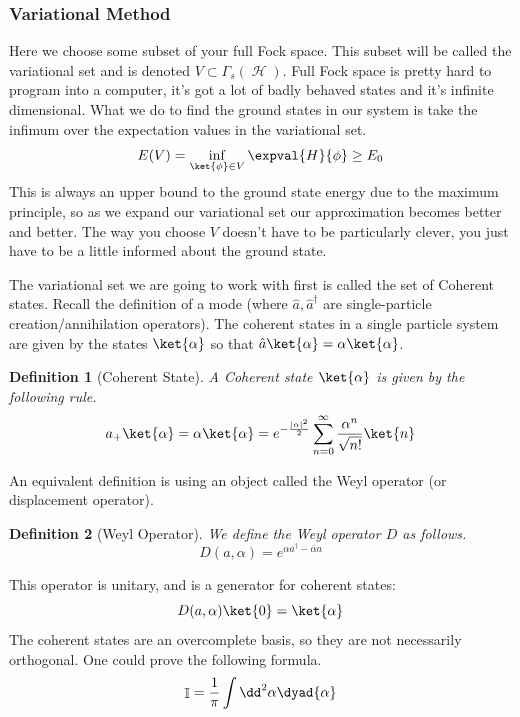 \documentclass{article}
\DeclareMathOperator{\Hh}{{\mathcal{H}}}
\DeclareMathOperator{\II}{\mathbb{I}}
\newtheorem{defn}{Definition}
\begin{document}
\subsubsection{Variational Method}
Here we choose some subset of your full Fock space. This subset will be called the variational set and is denoted $V \subset \Gamma_s(\Hh)$. Full Fock space is pretty hard to program into a computer, it's got a lot of badly behaved states and it's infinite dimensional. What we do to find the ground states in our system is take the infimum over the expectation values in the variational set.
\begin{equation}
E(V) = \inf_{\ket{\phi}\in V}\expval{H}{\phi} \geq E_0
\end{equation}
This is always an upper bound to the ground state energy due to the maximum principle, so as we expand our variational set our approximation becomes better and better. The way you choose $V$ doesn't have to be particularly clever, you just have to be a little informed about the ground state.

The variational set we are going to work with first is called the set of Coherent states. Recall the definition of a mode (where $\hat a, \hat a^\dagger$ are single-particle creation/annihilation operators). The coherent states in a single particle system are given by the states $\ket{\alpha}$ so that $\hat a\ket{\alpha} = \alpha\ket{\alpha}$.

\begin{defn}[Coherent State] A Coherent state $\ket{\alpha}$ is given by the following rule.
\begin{equation}
a_+\ket{\alpha} = \alpha\ket{\alpha} = e^{-\frac{|\alpha|^2}{2}}\sum_{n=0}^\infty\frac{\alpha^n}{\sqrt{n!}}\ket{n}
\end{equation}
\end{defn}
An equivalent definition is using an object called the Weyl operator (or displacement operator).
\begin{defn}[Weyl Operator] We define the Weyl operator $D$ as follows.
\begin{equation}D(a,\alpha) = e^{\alpha a^\dagger - \overline\alpha a}\end{equation}
\end{defn}
This operator is unitary, and is a generator for coherent states:
\[D(a,\alpha)\ket{0} = \ket{\alpha}\]
The coherent states are an overcomplete basis, so they are not necessarily orthogonal. One could prove the following formula.
\[\II=\frac{1}{\pi}\int \dd^2 \alpha \dyad{\alpha}\]
\end{document}

